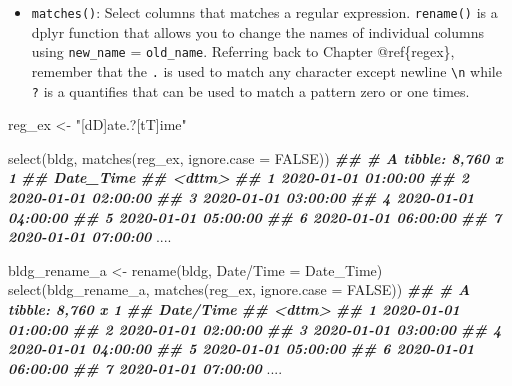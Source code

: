 \documentclass[
]{book}
\newenvironment{Shaded}{\begin{snugshade}}{\end{snugshade}}
\newcommand{\AttributeTok}[1]{\textcolor[rgb]{0.77,0.63,0.00}{#1}}
\newcommand{\ConstantTok}[1]{\textcolor[rgb]{0.00,0.00,0.00}{#1}}
\newcommand{\DocumentationTok}[1]{\textcolor[rgb]{0.56,0.35,0.01}{\textbf{\textit{#1}}}}
\newcommand{\FunctionTok}[1]{\textcolor[rgb]{0.00,0.00,0.00}{#1}}
\newcommand{\NormalTok}[1]{#1}
\newcommand{\OtherTok}[1]{\textcolor[rgb]{0.56,0.35,0.01}{#1}}
\newcommand{\StringTok}[1]{\textcolor[rgb]{0.31,0.60,0.02}{#1}}
\providecommand{\tightlist}{%
  \setlength{\itemsep}{0pt}\setlength{\parskip}{0pt}}
\begin{document}
\begin{itemize}
\tightlist
\item
  \texttt{matches()}: Select columns that matches a regular expression. \texttt{rename()} is a dplyr function that allows you to change the names of individual columns using \texttt{new\_name} = \texttt{old\_name}. Referring back to Chapter @ref\{regex\}, remember that the \texttt{.} is used to match any character except newline \texttt{\textbackslash{}n} while \texttt{?} is a quantifies that can be used to match a pattern zero or one times.
\end{itemize}

\begin{Shaded}
\begin{Highlighting}[]
\NormalTok{reg\_ex }\OtherTok{\textless{}{-}} \StringTok{"[dD]ate.?[tT]ime"}

\FunctionTok{select}\NormalTok{(bldg, }\FunctionTok{matches}\NormalTok{(reg\_ex, }\AttributeTok{ignore.case =} \ConstantTok{FALSE}\NormalTok{))}
\DocumentationTok{\#\# \# A tibble: 8,760 x 1}
\DocumentationTok{\#\#    Date\_Time          }
\DocumentationTok{\#\#    \textless{}dttm\textgreater{}             }
\DocumentationTok{\#\#  1 2020{-}01{-}01 01:00:00}
\DocumentationTok{\#\#  2 2020{-}01{-}01 02:00:00}
\DocumentationTok{\#\#  3 2020{-}01{-}01 03:00:00}
\DocumentationTok{\#\#  4 2020{-}01{-}01 04:00:00}
\DocumentationTok{\#\#  5 2020{-}01{-}01 05:00:00}
\DocumentationTok{\#\#  6 2020{-}01{-}01 06:00:00}
\DocumentationTok{\#\#  7 2020{-}01{-}01 07:00:00}
\NormalTok{....}

\NormalTok{bldg\_rename\_a }\OtherTok{\textless{}{-}} \FunctionTok{rename}\NormalTok{(bldg, }\StringTok{\textasciigrave{}}\AttributeTok{Date/Time}\StringTok{\textasciigrave{}} \OtherTok{=} \StringTok{\textasciigrave{}}\AttributeTok{Date\_Time}\StringTok{\textasciigrave{}}\NormalTok{)}
\FunctionTok{select}\NormalTok{(bldg\_rename\_a, }\FunctionTok{matches}\NormalTok{(reg\_ex, }\AttributeTok{ignore.case =} \ConstantTok{FALSE}\NormalTok{))}
\DocumentationTok{\#\# \# A tibble: 8,760 x 1}
\DocumentationTok{\#\#    \textasciigrave{}Date/Time\textasciigrave{}        }
\DocumentationTok{\#\#    \textless{}dttm\textgreater{}             }
\DocumentationTok{\#\#  1 2020{-}01{-}01 01:00:00}
\DocumentationTok{\#\#  2 2020{-}01{-}01 02:00:00}
\DocumentationTok{\#\#  3 2020{-}01{-}01 03:00:00}
\DocumentationTok{\#\#  4 2020{-}01{-}01 04:00:00}
\DocumentationTok{\#\#  5 2020{-}01{-}01 05:00:00}
\DocumentationTok{\#\#  6 2020{-}01{-}01 06:00:00}
\DocumentationTok{\#\#  7 2020{-}01{-}01 07:00:00}
\NormalTok{....}



\end{Highlighting}
\end{Shaded}
\end{document}
